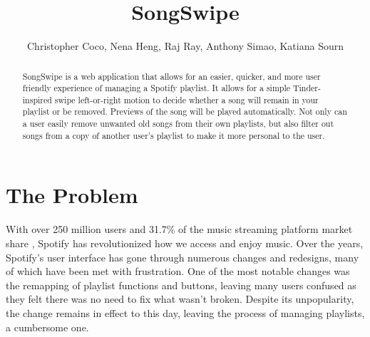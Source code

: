 \documentclass{article}
\title{SongSwipe}
\author{Christopher Coco, Nena Heng, Raj Ray, Anthony Simao, Katiana Sourn}
\begin{document}
\maketitle

\begin{abstract}
SongSwipe is a web application that allows for an easier, quicker, and more user friendly experience of managing a Spotify playlist. It allows for a simple Tinder-inspired swipe left-or-right motion to decide whether a song will remain in your playlist or be removed. Previews of the song will be played automatically. Not only can a user easily remove unwanted old songs from their own playlists, but also filter out songs from a copy of another user's playlist to make it more personal to the user.
\end{abstract}

\section{The Problem}
With over 250 million users and 31.7\% of the music streaming platform market share \cite{Spotify_stats}, Spotify \cite{Spotify_app} has revolutionized how we access and enjoy music. Over the years, Spotify's user interface has gone through numerous changes and redesigns, many of which have been met with frustration. One of the most notable changes was the remapping of playlist functions and buttons, leaving many users confused as they felt there was no need to fix what wasn’t broken. Despite its unpopularity, the change remains in effect to this day, leaving the process of managing playlists, a cumbersome one.\\
\end{document}
